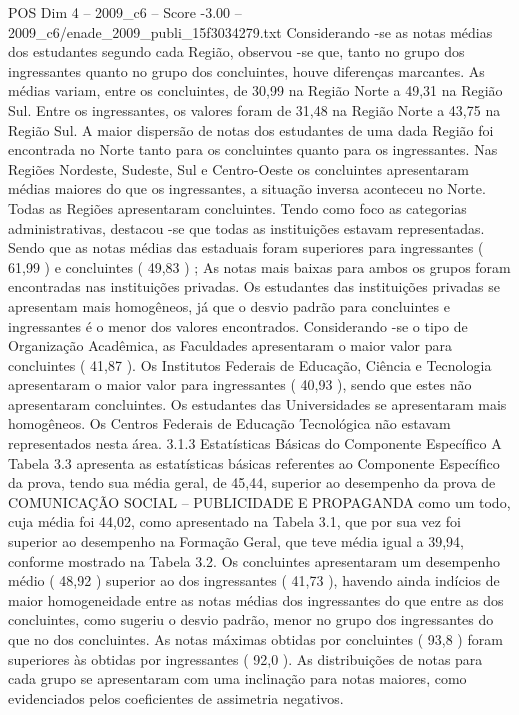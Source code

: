 \begin{textsample}{POS Dim 4 – 2009\_c6 – Score -3.00 – 2009\_c6/enade\_2009\_publi\_15f3034279.txt}
Considerando -se as notas médias dos estudantes segundo cada Região, observou -se que, tanto no grupo dos ingressantes quanto no grupo dos concluintes, houve diferenças marcantes.
As médias variam, entre os concluintes, de 30,99 na Região Norte a 49,31 na Região Sul.
Entre os ingressantes, os valores foram de 31,48 na Região Norte a 43,75 na Região Sul.
A maior dispersão de notas dos estudantes de uma dada Região foi encontrada no Norte tanto para os concluintes quanto para os ingressantes.
Nas Regiões Nordeste, Sudeste, Sul e Centro-Oeste os concluintes apresentaram médias maiores do que os ingressantes, a situação inversa aconteceu no Norte.
Todas as Regiões apresentaram concluintes.
Tendo como foco as categorias administrativas, destacou -se que todas as instituições estavam representadas.
Sendo que as notas médias das estaduais foram superiores para ingressantes ( 61,99 ) e concluintes ( 49,83 ) ; As notas mais baixas para ambos os grupos foram encontradas nas instituições privadas.
Os estudantes das instituições privadas se apresentam mais homogêneos, já que o desvio padrão para concluintes e ingressantes é o menor dos valores encontrados.
Considerando -se o tipo de Organização Acadêmica, as Faculdades apresentaram o maior valor para concluintes ( 41,87 ).
Os Institutos Federais de Educação, Ciência e Tecnologia apresentaram o maior valor para ingressantes ( 40,93 ), sendo que estes não apresentaram concluintes.
Os estudantes das Universidades se apresentaram mais homogêneos.
Os Centros Federais de Educação Tecnológica não estavam representados nesta área. 3.1.3 Estatísticas Básicas do Componente Específico A Tabela 3.3 apresenta as estatísticas básicas referentes ao Componente Específico da prova, tendo sua média geral, de 45,44, superior ao desempenho da prova de COMUNICAÇÃO SOCIAL – PUBLICIDADE E PROPAGANDA como um todo, cuja média foi 44,02, como apresentado na Tabela 3.1, que por sua vez foi superior ao desempenho na Formação Geral, que teve média igual a 39,94, conforme mostrado na Tabela 3.2.
Os concluintes apresentaram um desempenho médio ( 48,92 ) superior ao dos ingressantes ( 41,73 ), havendo ainda indícios de maior homogeneidade entre as notas médias dos ingressantes do que entre as dos concluintes, como sugeriu o desvio padrão, menor no grupo dos ingressantes do que no dos concluintes.
As notas máximas obtidas por concluintes ( 93,8 ) foram superiores às obtidas por ingressantes ( 92,0 ).
As distribuições de notas para cada grupo se apresentaram com uma inclinação para notas maiores, como evidenciados pelos coeficientes de assimetria negativos.

\end{textsample}
